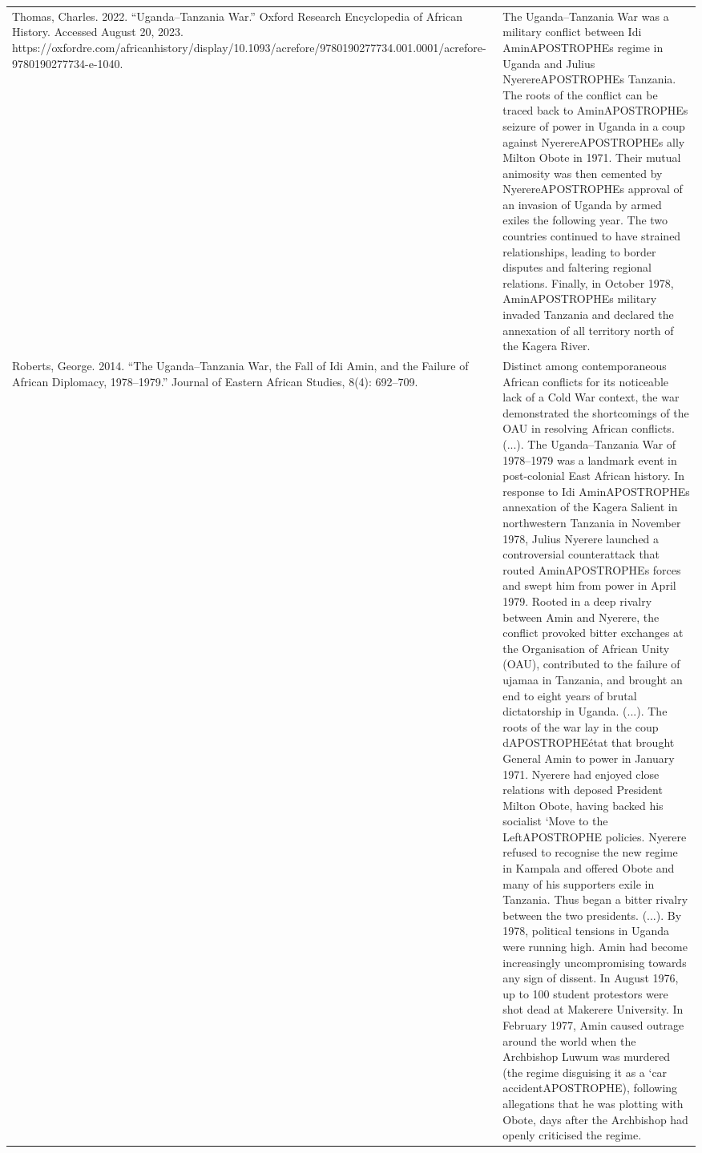 {\begin{longtable}{p{}p{}}
\\
Thomas, Charles. 2022. “Uganda–Tanzania War.” Oxford Research Encyclopedia of African History. Accessed August 20, 2023. https://oxfordre.com/africanhistory/display/10.1093/acrefore/9780190277734.001.0001/acrefore-9780190277734-e-1040. & The Uganda–Tanzania War was a military conflict between Idi AminAPOSTROPHEs regime in Uganda and Julius NyerereAPOSTROPHEs Tanzania. The roots of the conflict can be traced back to AminAPOSTROPHEs seizure of power in Uganda in a coup against NyerereAPOSTROPHEs ally Milton Obote in 1971. Their mutual animosity was then cemented by NyerereAPOSTROPHEs approval of an invasion of Uganda by armed exiles the following year. The two countries continued to have strained relationships, leading to border disputes and faltering regional relations. Finally, in October 1978, AminAPOSTROPHEs military invaded Tanzania and declared the annexation of all territory north of the Kagera River.
\\
Roberts, George. 2014. “The Uganda–Tanzania War, the Fall of Idi Amin, and the Failure of African Diplomacy, 1978–1979.” Journal of Eastern African Studies, 8(4): 692–709. & Distinct among contemporaneous African conflicts for its noticeable lack of a Cold War context, the war demonstrated the shortcomings of the OAU in resolving African conflicts. (...). The Uganda–Tanzania War of 1978–1979 was a landmark event in post-colonial East African history. In response to Idi AminAPOSTROPHEs annexation of the Kagera Salient in northwestern Tanzania in November 1978, Julius Nyerere launched a controversial counterattack that routed AminAPOSTROPHEs forces and swept him from power in April 1979. Rooted in a deep rivalry between Amin and Nyerere, the conflict provoked bitter exchanges at the Organisation of African Unity (OAU), contributed to the failure of ujamaa in Tanzania, and brought an end to eight years of brutal dictatorship in Uganda. (...). The roots of the war lay in the coup dAPOSTROPHEétat that brought General Amin to power in January 1971. Nyerere had enjoyed close relations with deposed President Milton Obote, having backed his socialist ‘Move to the LeftAPOSTROPHE policies. Nyerere refused to recognise the new regime in Kampala and offered Obote and many of his supporters exile in Tanzania. Thus began a bitter rivalry between the two presidents. (...). By 1978, political tensions in Uganda were running high. Amin had become increasingly uncompromising towards any sign of dissent. In August 1976, up to 100 student protestors were shot dead at Makerere University. In February 1977, Amin caused outrage around the world when the Archbishop Luwum was murdered (the regime disguising it as a ‘car accidentAPOSTROPHE), following allegations that he was plotting with Obote, days after the Archbishop had openly criticised the regime.

\end{longtable}}
